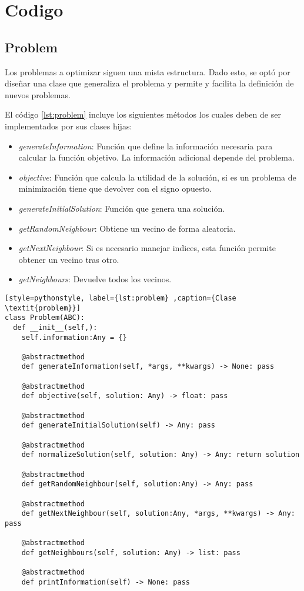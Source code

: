 \chapter{Codigo}

\section{Problem}

Los problemas a optimizar siguen una mista estructura. Dado esto, se optó por diseñar una clase que generaliza el problema y permite y facilita la definición de nuevos problemas.

El código \ref{lst:problem} incluye los siguientes métodos los cuales deben de ser implementados por sus clases hijas:
\begin{itemize}
	\item \textit{generateInformation}: Función que define la información necesaria para calcular la función objetivo. La información adicional depende del problema.
	\item \textit{objective}: Función que calcula la utilidad de la solución, si es un problema de minimización tiene que devolver con el signo opuesto. 
	\item \textit{generateInitialSolution}: Función que genera una solución.
	\item \textit{getRandomNeighbour}: Obtiene un vecino de forma aleatoria.
	\item \textit{getNextNeighbour}: Si es necesario manejar indices, esta función permite obtener un vecino tras otro.
	\item \textit{getNeighbours}: Devuelve todos los vecinos.
\end{itemize}

\begin{lstlisting}[style=pythonstyle, label={lst:problem} ,caption={Clase \textit{problem}}]
class Problem(ABC):
  def __init__(self,):
    self.information:Any = {}

    @abstractmethod
    def generateInformation(self, *args, **kwargs) -> None: pass

    @abstractmethod
    def objective(self, solution: Any) -> float: pass

    @abstractmethod
    def generateInitialSolution(self) -> Any: pass

	@abstractmethod
	def normalizeSolution(self, solution: Any) -> Any: return solution

    @abstractmethod
    def getRandomNeighbour(self, solution:Any) -> Any: pass

    @abstractmethod
    def getNextNeighbour(self, solution:Any, *args, **kwargs) -> Any: pass

    @abstractmethod
    def getNeighbours(self, solution: Any) -> list: pass

    @abstractmethod
    def printInformation(self) -> None: pass
\end{lstlisting}

